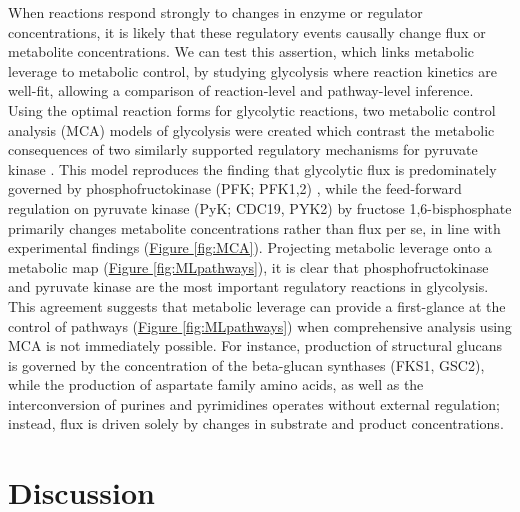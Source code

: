 When reactions respond strongly to changes in enzyme or regulator concentrations, it is likely that these regulatory events causally change flux or metabolite concentrations.  We can test this assertion, which links metabolic leverage to metabolic control, by studying glycolysis where reaction kinetics are well-fit, allowing a comparison of reaction-level and pathway-level inference.  Using the optimal reaction forms for glycolytic reactions, two metabolic control analysis (MCA) models of glycolysis were created which contrast the metabolic consequences of two similarly supported regulatory mechanisms for pyruvate kinase \cite{Cortassa:1994is, Westerhoff:1987jo}. This model reproduces the finding that glycolytic flux is predominately governed by phosphofructokinase (PFK; PFK1,2) \cite{Cortassa:1994is}, while the feed-forward regulation on pyruvate kinase (PyK; CDC19, PYK2) by fructose 1,6-bisphosphate primarily changes metabolite concentrations rather than flux per se, in line with experimental findings \cite{Xu:2012gg} (\hyperref[fig:MCA]{Figure \ref{fig:MCA}}). Projecting metabolic leverage onto a metabolic map (\hyperref[fig:MLpathways]{Figure \ref{fig:MLpathways}}), it is clear that phosphofructokinase and pyruvate kinase are the most important regulatory reactions in glycolysis.  This agreement suggests that metabolic leverage can provide a first-glance at the control of pathways (\hyperref[fig:MLpathways]{Figure \ref{fig:MLpathways}}) when comprehensive analysis using MCA is not immediately possible.  For instance, production of structural glucans is governed by the concentration of the beta-glucan synthases (FKS1, GSC2), while the production of aspartate family amino acids, as well as the interconversion of purines and pyrimidines operates without external regulation; instead, flux is driven solely by changes in substrate and product concentrations. 

\section{Discussion}

